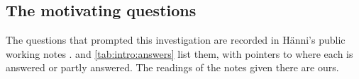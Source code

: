 \subsection{The motivating questions}\label{sec:philosophy:answers}

The questions that prompted this investigation are recorded in H\"anni's public working notes \citep{hanni2026notes}.  and \cref{tab:intro:answers} list them, with pointers to where each is answered or partly answered. The readings of the notes given there are ours.
